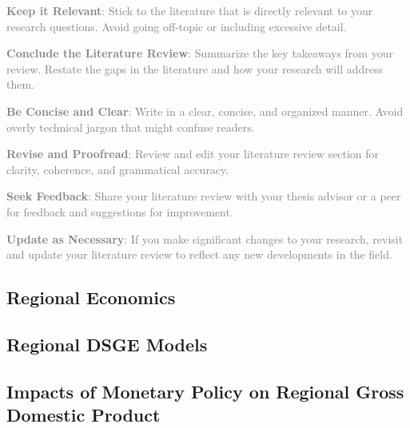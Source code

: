 \documentclass[../thesis.tex]{subfiles}
\begin{document}
	\textcolor{gray}{\textbf{Keep it Relevant}: Stick to the literature that is directly relevant to your research questions. Avoid going off-topic or including excessive detail.}
	
	\textcolor{gray}{\textbf{Conclude the Literature Review}: Summarize the key takeaways from your review. Restate the gaps in the literature and how your research will address them.}
	
	\textcolor{gray}{\textbf{Be Concise and Clear}: Write in a clear, concise, and organized manner. Avoid overly technical jargon that might confuse readers.}
	
	\textcolor{gray}{\textbf{Revise and Proofread}: Review and edit your literature review section for clarity, coherence, and grammatical accuracy.}
	
	\textcolor{gray}{\textbf{Seek Feedback}: Share your literature review with your thesis advisor or a peer for feedback and suggestions for improvement.}
	
	\textcolor{gray}{\textbf{Update as Necessary}: If you make significant changes to your research, revisit and update your literature review to reflect any new developments in the field.}

	\subsection*{Regional Economics}
	
	\subsection*{Regional DSGE Models}
	
	\subsection*{Impacts of Monetary Policy on Regional Gross Domestic Product}
\end{document}
